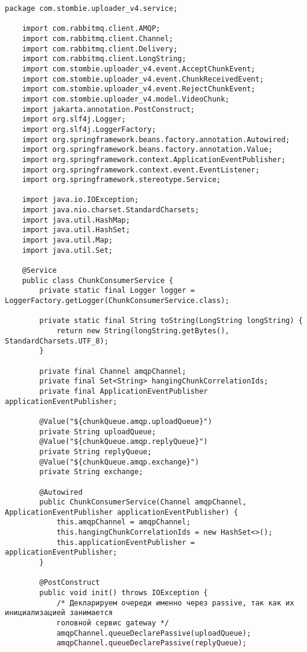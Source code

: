 \begin{lstlisting}[caption={ChunkConsumerService.java}]
	package com.stombie.uploader_v4.service;
	
	import com.rabbitmq.client.AMQP;
	import com.rabbitmq.client.Channel;
	import com.rabbitmq.client.Delivery;
	import com.rabbitmq.client.LongString;
	import com.stombie.uploader_v4.event.AcceptChunkEvent;
	import com.stombie.uploader_v4.event.ChunkReceivedEvent;
	import com.stombie.uploader_v4.event.RejectChunkEvent;
	import com.stombie.uploader_v4.model.VideoChunk;
	import jakarta.annotation.PostConstruct;
	import org.slf4j.Logger;
	import org.slf4j.LoggerFactory;
	import org.springframework.beans.factory.annotation.Autowired;
	import org.springframework.beans.factory.annotation.Value;
	import org.springframework.context.ApplicationEventPublisher;
	import org.springframework.context.event.EventListener;
	import org.springframework.stereotype.Service;
	
	import java.io.IOException;
	import java.nio.charset.StandardCharsets;
	import java.util.HashMap;
	import java.util.HashSet;
	import java.util.Map;
	import java.util.Set;
	
	@Service
	public class ChunkConsumerService {
		private static final Logger logger = LoggerFactory.getLogger(ChunkConsumerService.class);
		
		private static final String toString(LongString longString) {
			return new String(longString.getBytes(), StandardCharsets.UTF_8);
		}
		
		private final Channel amqpChannel;
		private final Set<String> hangingChunkCorrelationIds;
		private final ApplicationEventPublisher applicationEventPublisher;
		
		@Value("${chunkQueue.amqp.uploadQueue}")
		private String uploadQueue;
		@Value("${chunkQueue.amqp.replyQueue}")
		private String replyQueue;
		@Value("${chunkQueue.amqp.exchange}")
		private String exchange;
		
		@Autowired
		public ChunkConsumerService(Channel amqpChannel, ApplicationEventPublisher applicationEventPublisher) {
			this.amqpChannel = amqpChannel;
			this.hangingChunkCorrelationIds = new HashSet<>();
			this.applicationEventPublisher = applicationEventPublisher;
		}
		
		@PostConstruct
		public void init() throws IOException {
			/* Декларируем очереди именно через passive, так как их инициализацией занимается
			головной сервис gateway */
			amqpChannel.queueDeclarePassive(uploadQueue);
			amqpChannel.queueDeclarePassive(replyQueue);
			

\end{lstlisting}
